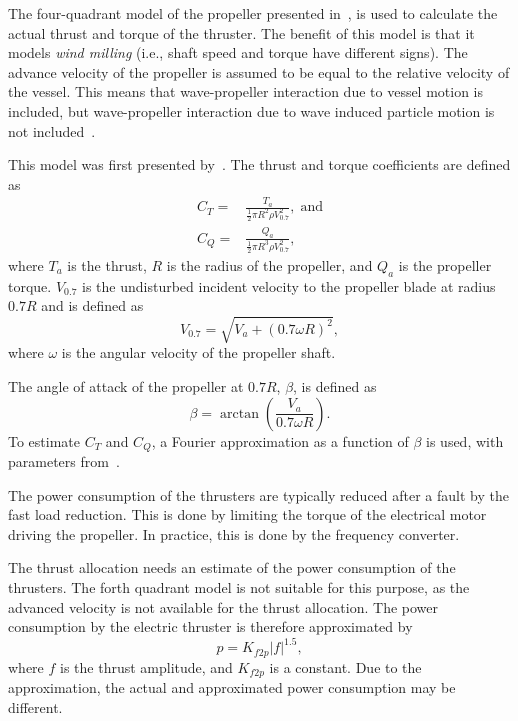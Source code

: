 \documentclass[journal]{IEEEtran}
\begin{document}
The four-quadrant model of the propeller presented in~\cite{Smogeli2006}, is used to calculate the actual thrust and torque of the thruster.
The benefit of this model is that it models \textit{wind milling} (i.e., shaft speed and torque have different signs).
The advance velocity of the propeller is assumed to be equal to the relative velocity of the vessel.
This means that wave-propeller interaction due to vessel motion is included, but wave-propeller interaction due to wave induced particle motion is not included~\cite{Sorensen2009}.

This model was first presented by~\cite{Miniovich1960}. 
The thrust and torque coefficients are defined as
\begin{align}
C_T =& \frac{T_a}{\frac{1}{2}\pi R^2 \rho V_{0.7}^2}, \; \mathrm{and} \\
C_Q =& \frac{Q_a}{\frac{1}{2}\pi R^3 \rho V_{0.7}^2},
\end{align}
where $T_a$ is the thrust, $R$ is the radius of the propeller, and $Q_a$ is the propeller torque. $V_{0.7}$ is the undisturbed incident velocity to the propeller blade at radius $0.7R$ and is defined as
\begin{equation}
V_{0.7}=\sqrt{V_a+(0.7\omega R)^2},
\end{equation}
where $\omega$ is the angular velocity of the propeller shaft.

The angle of attack of the propeller at $0.7R$, $\beta$, is defined as
\begin{equation}
\beta = \arctan\left(\frac{V_a}{0.7 \omega R}\right).
\end{equation}
To estimate $C_T$ and $C_Q$, a Fourier approximation as a function of $\beta$ is used, with parameters from~\cite{Smogeli2006}.

The power consumption of the thrusters are typically reduced after a fault by the fast load reduction.
This is done by limiting the torque of the electrical motor driving the propeller.
In practice, this is done by the frequency converter.

The thrust allocation needs an estimate of the power consumption of the thrusters.
The forth quadrant model is not suitable for this purpose, as the advanced velocity is not available for the thrust allocation.
The power consumption by the electric thruster is therefore approximated by
\begin{equation}
p = K_{f2p} |f|^{1.5},
\end{equation}
where $f$ is the thrust amplitude, and $K_{f2p}$ is a constant.
Due to the approximation, the actual and approximated power consumption may be different.
\end{document}
